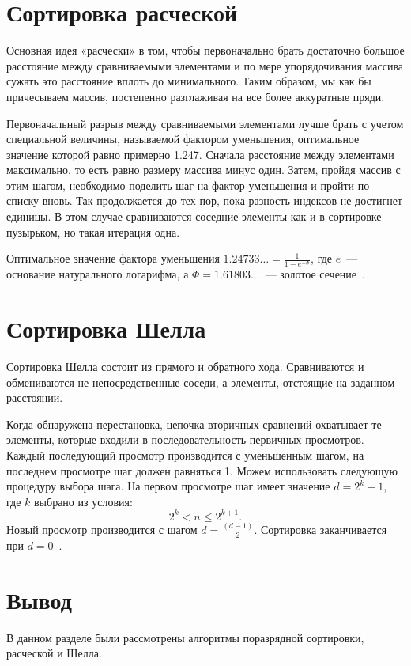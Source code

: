 \section{Сортировка расческой}
Основная идея «расчески» в том, чтобы первоначально брать достаточно большое расстояние между сравниваемыми элементами и по мере упорядочивания массива сужать это расстояние вплоть до минимального. 
Таким образом, мы как бы причесываем массив, постепенно разглаживая на все более аккуратные пряди. 

Первоначальный разрыв между сравниваемыми элементами лучше брать с учетом специальной величины, называемой фактором уменьшения, оптимальное значение которой равно примерно 1.247. 
Сначала расстояние между элементами максимально, то есть равно размеру массива минус один. 
Затем, пройдя массив с этим шагом, необходимо поделить шаг на фактор уменьшения и пройти по списку вновь. 
Так продолжается до тех пор, пока разность индексов не достигнет единицы. 
В этом случае сравниваются соседние элементы как и в сортировке пузырьком, но такая итерация одна.

Оптимальное значение фактора уменьшения $1.24733\dots = \frac{1}{1 - e^{-\Phi}}$, где $e$~--- основание натурального логарифма, а ${\Phi = 1.61803...}$~--- золотое сечение~\cite{article_sorts}.

\section{Сортировка Шелла}
Сортировка Шелла состоит из прямого и обратного хода. 
Сравниваются и обмениваются не непосредственные соседи, а элементы, отстоящие на заданном расстоянии. 

Когда обнаружена перестановка, цепочка вторичных сравнений охватывает те элементы, которые входили в последовательность первичных просмотров.
Каждый последующий просмотр производится с уменьшенным шагом, на последнем просмотре шаг должен равняться 1. 
Можем использовать следующую процедуру выбора шага. 
На первом просмотре шаг имеет значение $d = 2^{k} - 1$, где $k$ выбрано из условия: \[2^{k} < n \le 2^{k + 1}.\] 
Новый просмотр производится с шагом $d = \frac{(d - 1)}{2}$. 
Сортировка заканчивается при $d = 0$~\cite{shell}.

\section*{Вывод}
В данном разделе были рассмотрены алгоритмы поразрядной сортировки, расческой и Шелла.